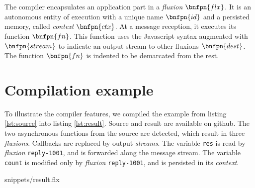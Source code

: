 \vspace{-1\baselineskip}
\begin{bnf*}
      { \bnfor {} \bnfsp {} \bnfsp {}}\\
      { \bnfsp {} \bnfsp {} \bnfsp {} \bnfsp {} \bnfsp {} \bnfsp {}}\\
      { \bnfor {} \bnfor {} \bnfsp {} \bnfsp {}}\\
       { \bnfsp {} }\\
         {}\\
          {\bnfts{\texttt{\{}}  \bnfts{\texttt{\}}}}\\
          {\bnfts{\texttt{[}}  \bnfts{\texttt{]}}}\\
         { \bnfor {} \bnfsp \bnfts{,} \bnfsp {}}\\
           {\bnfts{\texttt{>}\texttt{>}} \bnfor \bnfts{\texttt{-}\texttt{>}}}\\
           {}\\
           {}\\
\end{bnf*}
\vspace{-1.5\baselineskip}~\\
The compiler encapsulates an application part in a \textit{fluxion} $\bnfpn{flx}$.
It is an autonomous entity of execution with a unique name $\bnfpn{id}$ and a persisted memory, called \textit{context} $\bnfpn{ctx}$.
At a message reception, it executes its function $\bnfpn{fn}$.
This function uses the Javascript syntax augmented with $\bnfpn{stream}$ to indicate an output stream to other fluxions $\bnfpn{dest}$.
The function $\bnfpn{fn}$ is indented to be demarcated from the rest.

\section{Compilation example} \label{section:example}

To illustrate the compiler features, we compiled the example from listing \ref{lst:source} into listing \ref{lst:result}.
Source and result are available on github\cite{flx-example}.
The two asynchronous functions from the source are detected, which result in three \textit{fluxions}.
Callbacks are replaced by output \textit{streams}.
The variable \texttt{res} is read by \textit{fluxion} \texttt{reply-1001}, and is forwarded along the message stream.
The variable \texttt{count} is modified only by \textit{fluxion} \texttt{reply-1001}, and is persisted in its \textit{context}.

{snippets/result.flx}

\vfill\eject